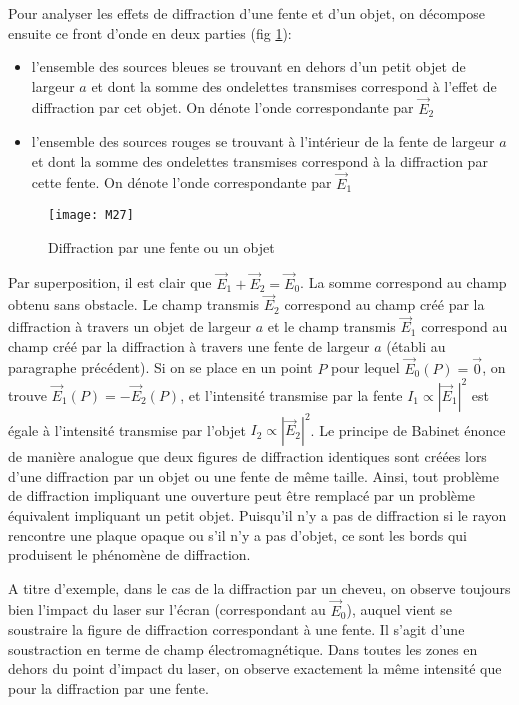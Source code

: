 \noindent Pour analyser les effets de diffraction d'une fente et d'un objet, on décompose ensuite ce front d'onde en deux parties (fig \ref{d2}):
\begin{itemize}
    \item l'ensemble des sources bleues se trouvant en dehors d'un petit objet de largeur $a$ et dont la somme des ondelettes transmises correspond à l'effet de diffraction par cet objet. On dénote l'onde correspondante par $\overset\rightarrow{E}_2$
    \item l'ensemble des sources rouges se trouvant à l'intérieur de la fente de largeur $a$ et dont la somme des ondelettes transmises correspond à la diffraction par cette fente. On dénote l'onde correspondante par $\overset\rightarrow{E}_1$
\end{itemize}

\begin{figure}[h]
    \centering
    \texttt{[image: M27]}
    \caption{Diffraction par une fente ou un objet}
    \label{d2}
\end{figure}

\noindent Par superposition, il est clair que $\overset\rightarrow{E}_1+\overset\rightarrow{E}_2=\overset\rightarrow{E}_0$. La somme correspond au champ obtenu sans obstacle. Le champ transmis $\overset\rightarrow{E}_2$ correspond au champ créé par la diffraction à travers un objet de largeur $a$ et le champ transmis $\overset\rightarrow{E}_1$ correspond au champ créé par la diffraction à travers une fente de largeur $a$ (établi au paragraphe précédent).
Si on se place en un point $P$ pour lequel $\overset\rightarrow{E}_0(P)=\overset\rightarrow{0}$, on trouve $\overset\rightarrow{E}_1(P)=-\overset\rightarrow{E}_2(P)$, et l'intensité transmise par la fente $I_1\propto |\overset\rightarrow{E}_1|^2$ est égale à l'intensité transmise par l'objet $I_2\propto |\overset\rightarrow{E}_2|^2$. Le principe de Babinet énonce de manière analogue que deux figures de diffraction identiques sont créées lors d'une diffraction par un objet ou une fente de même taille. Ainsi, tout problème de diffraction impliquant une ouverture peut être remplacé par un problème équivalent impliquant un petit objet. Puisqu'il n'y a pas de diffraction si le rayon rencontre une plaque opaque ou s'il n'y a pas d'objet, ce sont les bords qui produisent le phénomène de diffraction.

\noindent A titre d'exemple, dans le cas de la diffraction par un cheveu, on observe toujours bien l'impact du laser sur l'écran (correspondant au $\overset\rightarrow{E}_0$), auquel vient se soustraire la figure de diffraction correspondant à une fente. Il s'agit d'une soustraction en terme de champ électromagnétique. Dans toutes les zones en dehors du point d'impact du laser, on observe exactement la même intensité que pour la diffraction par une fente.


